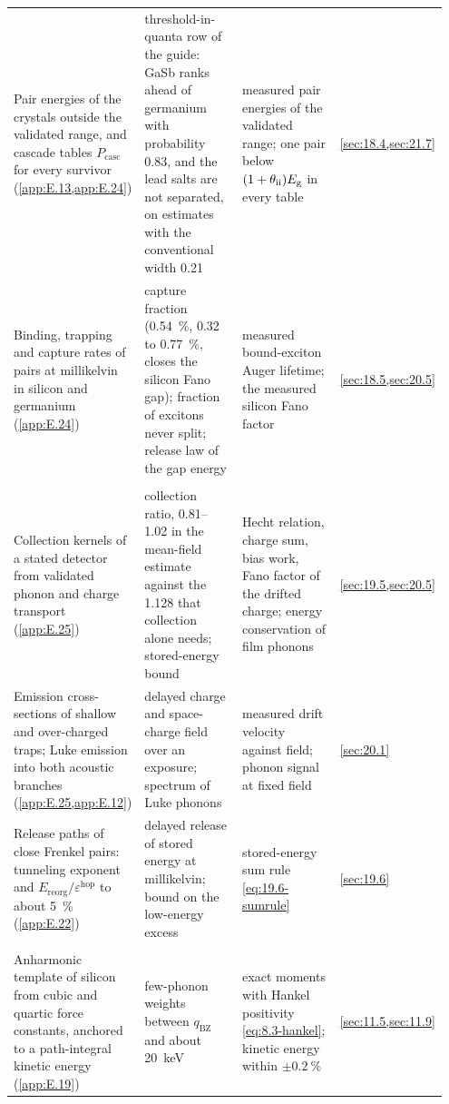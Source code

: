{\begin{longtable}{@{}>{\raggedright\arraybackslash}p{0.25\linewidth}>{\raggedright\arraybackslash}p{0.305\linewidth}>{\raggedright\arraybackslash}p{0.305\linewidth}>{\raggedright\arraybackslash}p{0.09\linewidth}@{}}
  Pair energies of the crystals outside the validated range, and cascade tables $P_{\mathrm{casc}}$ for every survivor (\cref{app:E.13,app:E.24}) & threshold-in-quanta row of the guide: GaSb ranks ahead of germanium with probability 0.83, and the lead salts are not separated, on estimates with the conventional width 0.21 & measured pair energies of the validated range; one pair below $(1 + \theta_{\mathrm{ii}})E_{\mathrm{g}}$ in every table & \cref{sec:18.4,sec:21.7} \\
  Binding, trapping and capture rates of pairs at millikelvin in silicon and germanium (\cref{app:E.24}) & capture fraction (\SI{0.54}{\percent}, 0.32 to \SI{0.77}{\percent}, closes the silicon Fano gap); fraction of excitons never split; release law of the gap energy & measured bound-exciton Auger lifetime; the measured silicon Fano factor & \cref{sec:18.5,sec:20.5} \\
  \midrule
  \multicolumn{4}{@{}l}{\emph{Readout and delayed signals}} \\
  Collection kernels of a stated detector from validated phonon and charge transport (\cref{app:E.25}) & collection ratio, 0.81--1.02 in the mean-field estimate against the 1.128 that collection alone needs; stored-energy bound & Hecht relation, charge sum, bias work, Fano factor of the drifted charge; energy conservation of film phonons & \cref{sec:19.5,sec:20.5} \\
  Emission cross-sections of shallow and over-charged traps; Luke emission into both acoustic branches (\cref{app:E.25,app:E.12}) & delayed charge and space-charge field over an exposure; spectrum of Luke phonons & measured drift velocity against field; phonon signal at fixed field & \cref{sec:20.1} \\
  Release paths of close Frenkel pairs: tunneling exponent and $E_{\mathrm{reorg}}/\varepsilon^{\mathrm{hop}}$ to about \SI{5}{\percent} (\cref{app:E.22}) & delayed release of stored energy at millikelvin; bound on the low-energy excess & stored-energy sum rule \cref{eq:19.6-sumrule} & \cref{sec:19.6} \\
  \midrule
  \multicolumn{4}{@{}l}{\emph{Lattice, spin, superconducting and novel targets}} \\
  Anharmonic template of silicon from cubic and quartic force constants, anchored to a path-integral kinetic energy (\cref{app:E.19}) & few-phonon weights between $q_{\mathrm{BZ}}$ and about \SI{20}{keV} & exact moments with Hankel positivity \cref{eq:8.3-hankel}; kinetic energy within $\pm\SI{0.2}{\percent}$ & \cref{sec:11.5,sec:11.9} \\

\end{longtable}}
